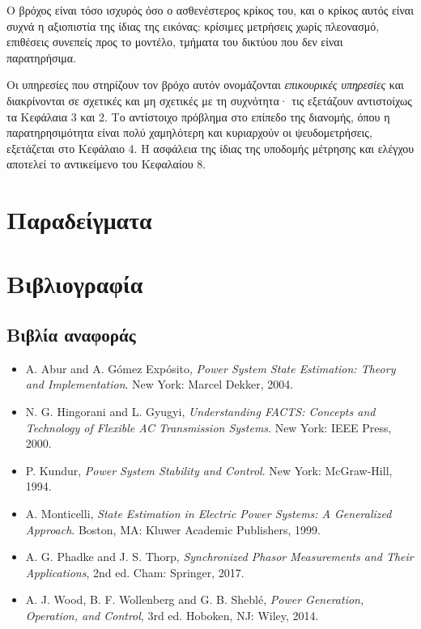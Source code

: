 Ο βρόχος είναι τόσο ισχυρός όσο ο ασθενέστερος κρίκος του, και ο κρίκος αυτός είναι συχνά
η αξιοπιστία της ίδιας της εικόνας: κρίσιμες μετρήσεις χωρίς πλεονασμό, επιθέσεις συνεπείς
προς το μοντέλο, τμήματα του δικτύου που δεν είναι παρατηρήσιμα.

Οι υπηρεσίες που στηρίζουν τον βρόχο αυτόν ονομάζονται \emph{επικουρικές υπηρεσίες} και
διακρίνονται σε σχετικές και μη σχετικές με τη συχνότητα· τις εξετάζουν αντιστοίχως τα
Κεφάλαια 3 και 2. Το αντίστοιχο πρόβλημα στο επίπεδο της διανομής, όπου η παρατηρησιμότητα
είναι πολύ χαμηλότερη και κυριαρχούν οι ψευδομετρήσεις, εξετάζεται στο Κεφάλαιο 4. Η
ασφάλεια της ίδιας της υποδομής μέτρησης και ελέγχου αποτελεί το αντικείμενο του
Κεφαλαίου 8.

\section{Παραδείγματα}
\label{kef-01-paradeigmata}

\section{Βιβλιογραφία}
\label{kef-01-vivliografia}

\subsection*{Βιβλία αναφοράς}

\begin{itemize}
\item A. Abur and A. Gómez Expósito, \textit{Power System State Estimation: Theory and
      Implementation}. New York: Marcel Dekker, 2004.
\item N. G. Hingorani and L. Gyugyi, \textit{Understanding FACTS: Concepts and Technology of
      Flexible AC Transmission Systems}. New York: IEEE Press, 2000.
\item P. Kundur, \textit{Power System Stability and Control}. New York: McGraw-Hill, 1994.
\item A. Monticelli, \textit{State Estimation in Electric Power Systems: A Generalized
      Approach}. Boston, MA: Kluwer Academic Publishers, 1999.
\item A. G. Phadke and J. S. Thorp, \textit{Synchronized Phasor Measurements and Their
      Applications}, 2nd ed. Cham: Springer, 2017.
\item A. J. Wood, B. F. Wollenberg and G. B. Sheblé, \textit{Power Generation, Operation, and
      Control}, 3rd ed. Hoboken, NJ: Wiley, 2014.
\end{itemize}

